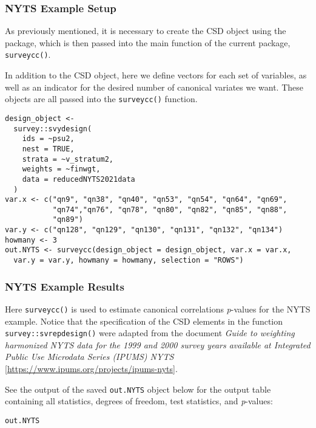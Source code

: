 \hypertarget{nyts-example-setup}{%
\subsubsection{NYTS Example Setup}\label{nyts-example-setup}}

As previously mentioned, it is necessary to create the CSD object using the  package, which is then passed into the main function of the current package, \texttt{surveycc()}.

In addition to the CSD object, here we define vectors for each set of variables, as well as an indicator for the desired number of canonical variates we want. These objects are all passed into the \texttt{surveycc()} function.

\begin{verbatim}
design_object <-
  survey::svydesign(
    ids = ~psu2,
    nest = TRUE,
    strata = ~v_stratum2,
    weights = ~finwgt,
    data = reducedNYTS2021data
  )
var.x <- c("qn9", "qn38", "qn40", "qn53", "qn54", "qn64", "qn69",
           "qn74","qn76", "qn78", "qn80", "qn82", "qn85", "qn88",
           "qn89")
var.y <- c("qn128", "qn129", "qn130", "qn131", "qn132", "qn134")
howmany <- 3
out.NYTS <- surveycc(design_object = design_object, var.x = var.x,
  var.y = var.y, howmany = howmany, selection = "ROWS")
\end{verbatim}

\hypertarget{nyts-example-results}{%
\subsubsection{NYTS Example Results}\label{nyts-example-results}}

Here \texttt{surveycc()} is used to estimate canonical correlations \emph{p}-values for the NYTS example. Notice that the specification of the CSD elements in the function \texttt{survey::svrepdesign()} were adapted from the document \emph{Guide to weighting harmonized NYTS data for the 1999 and 2000 survey years available at Integrated Public Use Microdata Series (IPUMS) NYTS} {[}\url{https://www.ipums.org/projects/ipums-nyts}{]}.

See the output of the saved \texttt{out.NYTS} object below for the output table containing all statistics, degrees of freedom, test statistics, and \emph{p}-values:

\begin{verbatim}
out.NYTS
\end{verbatim}


